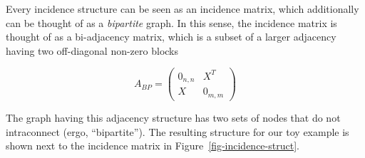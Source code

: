 \documentclass[%
	12pt,
		oneside,
		letterpaper
]{book}
\begin{document}
Every incidence structure can be seen as an incidence matrix, which additionally can be thought of as a \emph{bipartite} graph.
In this sense, the incidence matrix is thought of as a bi-adjacency matrix, which is a subset of a larger adjacency having two off-diagonal non-zero blocks

\[
A_{BP} = 
\begin{pmatrix}
0_{n,n} & X^T \\
X & 0_{m,m}
\end{pmatrix}
\]

The graph having this adjacency structure has two sets of nodes that do not intraconnect (ergo, ``bipartite'').
The resulting structure for our toy example is shown next to the incidence matrix in Figure~\ref{fig-incidence-struct}.

\begin{figure}

\begin{minipage}{0.50\linewidth}

\centering{

\[
\small
X^{m\times n}=
\begin{array}{c c}
& \begin{array}{cccccccccc} a & b & c & d & e & f & g & h & i & j\\ \end{array} \\
\begin{array}{c c } x_1\\x_2\\x_3\\x_4\\ \vdots \\ x_m\end{array} &
\left[
\begin{array}{c c c c c c c c c c}
  .  & .   &  1  & .   &  1  & .   &  1  &  1  & .   & .  \\
  1  & .   & .   & .   &  1  &  1  & .   & .   & .   & .  \\
  .  &  1  & .   & .   & .   &  1  & .   & .   &  1  &  1 \\
  .  & .   & .   &  1  &  1  & .   & .   &  1  & .   & .  \\
  &&&& \vdots &&&&&
  \\
  &&&& \vdots &&&&&
\end{array}
\right]
\end{array}
\]

}


\end{minipage}
\end{figure}
\end{document}
